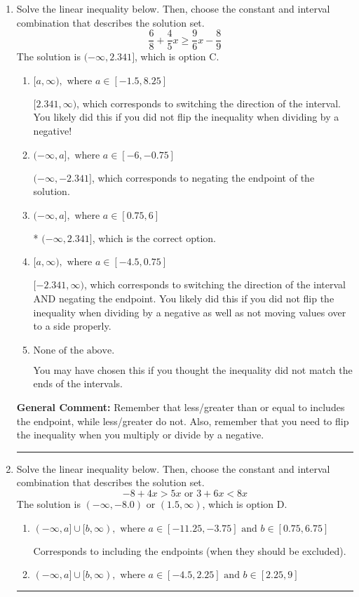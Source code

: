 \documentclass{extbook}[14pt]
\newcommand{\litem}[1]{\item #1

\rule{\textwidth}{0.4pt}}
\begin{document}
\begin{enumerate}\litem{
Solve the linear inequality below. Then, choose the constant and interval combination that describes the solution set.
\[ \frac{6}{8} + \frac{4}{5} x \geq \frac{9}{6} x - \frac{8}{9} \]The solution is \( (-\infty, 2.341] \), which is option C.\begin{enumerate}[label=\Alph*.]
\item \( [a, \infty), \text{ where } a \in [-1.5, 8.25] \)

 $[2.341, \infty)$, which corresponds to switching the direction of the interval. You likely did this if you did not flip the inequality when dividing by a negative!
\item \( (-\infty, a], \text{ where } a \in [-6, -0.75] \)

 $(-\infty, -2.341]$, which corresponds to negating the endpoint of the solution.
\item \( (-\infty, a], \text{ where } a \in [0.75, 6] \)

* $(-\infty, 2.341]$, which is the correct option.
\item \( [a, \infty), \text{ where } a \in [-4.5, 0.75] \)

 $[-2.341, \infty)$, which corresponds to switching the direction of the interval AND negating the endpoint. You likely did this if you did not flip the inequality when dividing by a negative as well as not moving values over to a side properly.
\item \( \text{None of the above}. \)

You may have chosen this if you thought the inequality did not match the ends of the intervals.
\end{enumerate}

\textbf{General Comment:} Remember that less/greater than or equal to includes the endpoint, while less/greater do not. Also, remember that you need to flip the inequality when you multiply or divide by a negative.
}
\litem{
Solve the linear inequality below. Then, choose the constant and interval combination that describes the solution set.
\[ -8 + 4 x > 5 x \text{ or } 3 + 6 x < 8 x \]The solution is \( (-\infty, -8.0) \text{ or } (1.5, \infty) \), which is option D.\begin{enumerate}[label=\Alph*.]
\item \( (-\infty, a] \cup [b, \infty), \text{ where } a \in [-11.25, -3.75] \text{ and } b \in [0.75, 6.75] \)

Corresponds to including the endpoints (when they should be excluded).
\item \( (-\infty, a] \cup [b, \infty), \text{ where } a \in [-4.5, 2.25] \text{ and } b \in [2.25, 9] \)


\end{enumerate}}
\end{enumerate}
\end{document}
